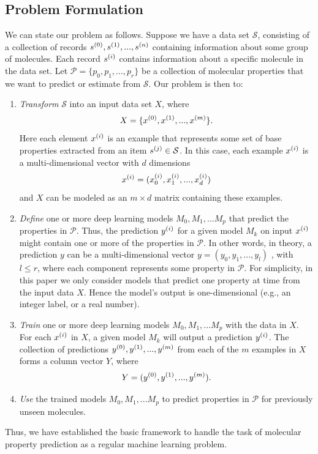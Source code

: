 \subsection{Problem Formulation}
We can state our problem as follows. Suppose we have a data set $\mathcal{S}$, consisting of a collection of records $s^{(0)}, s^{(1)}, ..., s^{(n)}$ containing information about some group of molecules. Each record $s^{(i)}$ contains information about a specific molecule in the data set. Let $\mathcal{P} = \{p_0, p_1, ..., p_r\}$ be a collection of molecular properties that we want to predict or estimate from $\mathcal{S}$.  Our problem is  then to: 
\begin{enumerate}
	\item {\em Transform} $\mathcal{S}$ into an input data set  $X$, where 
	\[X = \{x^{(0)}, x^{(1)}, ..., x^{(m)}\}.\] Here each element $x^{(i)}$ is an example that represents 
	some set of base properties extracted from an item $s^{(j)} \in  \mathcal{S}$. In this case, each example $x^{(i)}$ is a multi-dimensional vector with $d$ dimensions
	\[x^{(i)}=(x^{(i)}_0, x^{(i)}_1, ..., x^{(i)}_d)\] and 
	$X$ can be modeled as an $m \times d$ matrix containing these examples.
	\item {\em Define} one or more deep learning models $M_0, M_1, ... M_p$ that predict the properties in $\mathcal{P}$. Thus, the prediction $y^{(i)}$ for a given model $M_k$ on input $x^{(i)}$ might contain one or more of the properties in $\mathcal{P}$. In other words, in theory, a prediction $y$ can be a multi-dimensional vector $y = (y_0, y_1, ..., y_l)$ , with $l \leq r$, where each component represents some property in $\mathcal{P}$. For simplicity, in this paper we only consider models that predict one property at time from the input data $X$. Hence the model's output is one-dimensional (e.g., an integer label, or a real number).
	\item {\em Train} one or more deep learning models $M_0, M_1, ... M_p$ with the data in $X$. For each $x^{(i)}$ in $X$, a given model $M_k$ will output a prediction $y^{(i)}$. The collection of predictions $y^{(0)}, y^{(1)}, ..., y^{(m)}$ from each of the $m$ examples in $X$ forms a column vector $Y$,  where
	\[ Y  = (y^{(0)}, y^{(1)}, ..., y^{(m)}).\] 
	\item {\em Use} the trained models $M_0, M_1, ... M_p$ to predict properties in $\mathcal{P}$ for previously unseen molecules. 
\end{enumerate}
Thus, we have established the basic framework to handle the task of molecular property prediction as a regular machine learning problem. 
